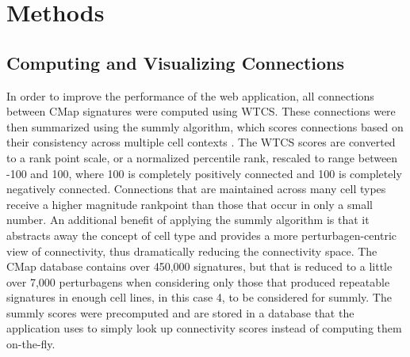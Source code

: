 \documentclass[12pt]{article}
\begin{document}



\section{Methods}
\subsection{Computing and Visualizing Connections}

In order to improve the performance of the web application, all connections between CMap signatures were computed using WTCS. These connections were then summarized using the summly algorithm, which scores connections based on their consistency across multiple cell contexts \cite{subramanian_summly}. The WTCS scores are converted to a rank point scale, or a normalized percentile rank, rescaled to range between -100 and 100, where 100 is completely positively connected and 100 is completely negatively connected. Connections that are maintained across many cell types receive a higher magnitude rankpoint than those that occur in only a small number. An additional benefit of applying the summly algorithm is that it abstracts away the concept of cell type and provides a more perturbagen-centric view of connectivity, thus dramatically reducing the connectivity space. The CMap database contains over 450,000 signatures, but that is reduced to a little over 7,000 perturbagens when considering only those that produced repeatable signatures in enough cell lines, in this case 4, to be considered for summly. The summly scores were precomputed and are stored in a database that the application uses to simply look up connectivity scores instead of computing them on-the-fly. 
\end{document}
